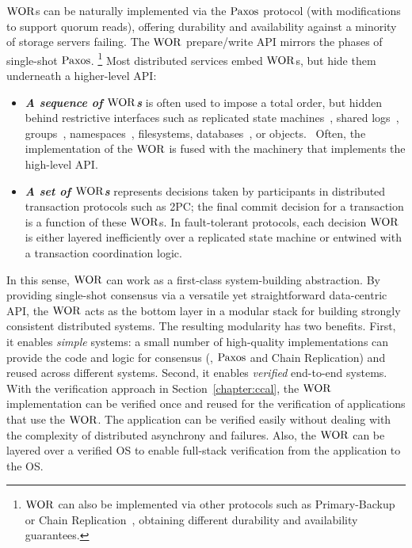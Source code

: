 $\mathrm{WOR}$s can be naturally implemented via the $\mathrm{Paxos}$ protocol (with modifications to support quorum reads), 
offering durability and availability against a minority of storage servers failing. 
The $\mathrm{WOR}$  prepare/write API mirrors the phases of single-shot $\mathrm{Paxos}$. 
\footnote{$\mathrm{WOR}$ can also be implemented via other protocols such as Primary-Backup or Chain Replication~\cite{chainreplication}, 
obtaining different durability and availability guarantees.}
Most distributed services embed $\mathrm{WOR}$s, but hide them underneath a higher-level API:

\begin{itemize}
\item \textbf{\textit{A sequence of $\mathrm{WOR}$s}} is often used to impose a total order, but hidden behind restrictive interfaces such as replicated state machines~\cite{smr, rvrpaxos}, shared logs~\cite{corfu}, groups~\cite{GC, horus}, namespaces~\cite{chubby, zookeeper}, filesystems, databases~\cite{hyder}, or objects.~\cite{tango} Often, the implementation of the $\mathrm{WOR}$ is fused with the machinery that implements the high-level API.

\item \textbf{\textit{A set of $\mathrm{WOR}$s}} represents decisions taken by participants in distributed transaction protocols such as 2PC; the final commit decision for a transaction is a function of these $\mathrm{WOR}$s. In fault-tolerant protocols, each decision $\mathrm{WOR}$ is either layered inefficiently over a replicated state machine or entwined with a transaction coordination logic.~\cite{gray:2006}
\end{itemize}

In this sense, $\mathrm{WOR}$ can work as a first-class system-building abstraction.
By providing single-shot consensus via a versatile yet straightforward data-centric API, 
the $\mathrm{WOR}$ acts as the bottom layer in a modular stack for building strongly consistent distributed systems. 
The resulting modularity has two benefits.
First, it enables \textit{simple} systems: a small number of high-quality implementations can provide the code and logic for consensus
(\eg, $\mathrm{Paxos}$ and Chain Replication) and reused across different systems. 
Second, it enables \textit{verified} end-to-end systems.
With the verification approach in Section~\ref{chapter:ccal}, 
the $\mathrm{WOR}$ implementation can be verified once and reused for the verification of applications that use the $\mathrm{WOR}$.
The application can be verified easily without dealing with the complexity of distributed asynchrony and failures. 
Also, the $\mathrm{WOR}$ can be layered over a verified OS to enable full-stack verification from the application to the OS. 

